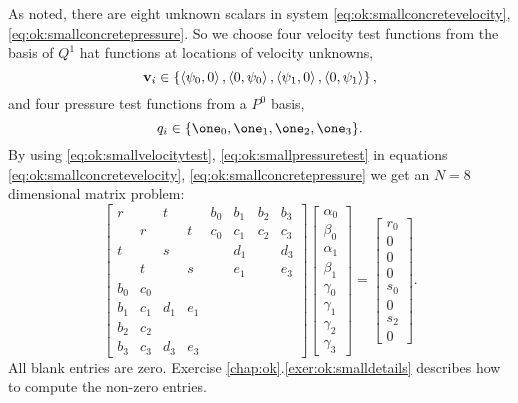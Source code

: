 As noted, there are eight unknown scalars in system \eqref{eq:ok:smallconcretevelocity}, \eqref{eq:ok:smallconcretepressure}.  So we choose four velocity test functions from the basis of $Q^1$ hat functions at locations of velocity unknowns,
\begin{equation}
\mathbf{v}_i \in \left\{\left<\psi_0,0\right>, \left<0,\psi_0\right>, \left<\psi_1,0\right>, \left<0,\psi_1\right>\right\},  \label{eq:ok:smallvelocitytest}
\end{equation}
and four pressure test functions from a $P^0$ basis,
\begin{equation}
q_i \in \{\one_0,\one_1,\one_2,\one_3\}.  \label{eq:ok:smallpressuretest}
\end{equation}
By using \eqref{eq:ok:smallvelocitytest}, \eqref{eq:ok:smallpressuretest} in equations \eqref{eq:ok:smallconcretevelocity}, \eqref{eq:ok:smallconcretepressure} we get an $N=8$ dimensional matrix problem:
\begin{equation}
\begin{bmatrix}
r   &     & t   &     & b_0 & b_1 & b_2 & b_3 \\
    & r   &     & t   & c_0 & c_1 & c_2 & c_3 \\
t   &     & s   &     &     & d_1 &     & d_3 \\
    & t   &     & s   &     & e_1 &     & e_3 \\
b_0 & c_0 &     &     \\
b_1 & c_1 & d_1 & e_1 \\
b_2 & c_2 &     &     \\
b_3 & c_3 & d_3 & e_3
\end{bmatrix} 
\begin{bmatrix}
\alpha_0 \\ \beta_0 \\ \alpha_1 \\ \beta_1 \\ \gamma_0 \\ \gamma_1 \\ \gamma_2 \\ \gamma_3
\end{bmatrix}
=
\begin{bmatrix}
r_0 \\
0 \\
0 \\
0 \\
s_0 \\
0 \\
s_2 \\
0
\end{bmatrix}.  \label{eq:ok:smallmatrixproblem}
\end{equation} 
All blank entries are zero.  Exercise \ref{chap:ok}.\ref{exer:ok:smalldetails} describes how to compute the non-zero entries.


